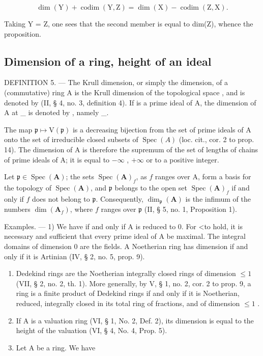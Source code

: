 \[
\dim (\mathrm{Y}) + \operatorname{codim} (\mathrm{Y}, \mathrm{Z}) = \dim (\mathrm{X}) - \operatorname{codim} (\mathrm{Z}, \mathrm{X}).
\]

Taking Y = Z, one sees that the second member is equal to dim(Z), whence the proposition.

\subsection{Dimension of a ring, height of an ideal}

DEFINITION 5. — The Krull dimension, or simply the dimension, of a (commutative) ring A is the Krull dimension of the topological space , and is denoted by  (II, § 4, no. 3, definition 4). If  is a prime ideal of A, the dimension of A at \_ is denoted by , namely \_.

The map \(\mathfrak{p} \mapsto \mathrm{V}(\mathfrak{p})\) is a decreasing bijection from the set of prime ideals of A onto the set of irreducible closed subsets of \(\operatorname{Spec}(A)\) (loc. cit., cor. 2 to prop. 14). The dimension of A is therefore the supremum of the set of lengths of chains of prime ideals of A; it is equal to \(-\infty\) , \(+\infty\) or to a positive integer.

Let \(\mathfrak{p} \in \operatorname{Spec}(\mathbf{A})\); the sets \(\operatorname{Spec}(\mathbf{A})_f\), as \(f\) ranges over A, form a basis for the topology of \(\operatorname{Spec}(\mathbf{A})\), and \(\mathfrak{p}\) belongs to the open set \(\operatorname{Spec}(\mathbf{A})_f\) if and only if \(f\) does not belong to \(\mathfrak{p}\). Consequently, \(\dim_{\mathfrak{p}}(\mathbf{A})\) is the infimum of the numbers \(\dim(\mathbf{A}_f)\), where \(f\) ranges over \(\mathfrak{p}\) (II, § 5, no. 1, Proposition 1).

Examples. --- 1) We have  if and only if A is reduced to 0. For \textless to hold, it is necessary and sufficient that every prime ideal of A be maximal. The integral domains of dimension 0 are the fields. A Noetherian ring has dimension {} if and only if it is Artinian (IV, § 2, no. 5, prop. 9).

\begin{enumerate}
\def\labelenumi{\arabic{enumi})}
\setcounter{enumi}{1}
\item
  Dedekind rings are the Noetherian integrally closed rings of dimension \(\leqslant 1\) (VII, § 2, no. 2, th. 1). More generally, by V, § 1, no. 2, cor. 2 to prop. 9, a ring is a finite product of Dedekind rings if and only if it is Noetherian, reduced, integrally closed in its total ring of fractions, and of dimension \(\leqslant 1\) .
\item
  If A is a valuation ring (VI, § 1, No. 2, Def. 2), its dimension is equal to the height of the valuation (VI, § 4, No. 4, Prop. 5).
\item
  Let A be a ring. We have
\end{enumerate}

